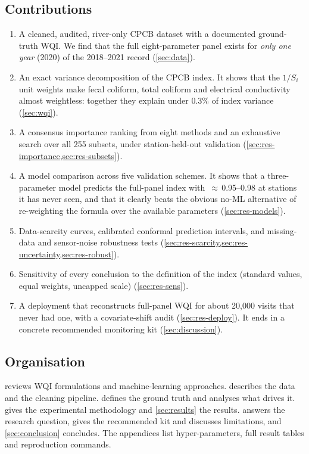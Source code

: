 \subsection{Contributions}

\begin{enumerate}
  \item A cleaned, audited, river-only CPCB dataset with a documented ground-truth WQI. We find that the full eight-parameter panel exists for \emph{only one year} (2020) of the 2018--2021 record (\cref{sec:data}).
  \item An exact variance decomposition of the CPCB index. It shows that the $1/S_i$ unit weights make fecal coliform, total coliform and electrical conductivity almost weightless: together they explain under 0.3\% of index variance (\cref{sec:wqi}).
  \item A consensus importance ranking from eight methods and an exhaustive search over all 255 subsets, under station-held-out validation (\cref{sec:res-importance,sec:res-subsets}).
  \item A model comparison across five validation schemes. It shows that a three-parameter model predicts the full-panel index with \R{}\,$\approx$\,0.95--0.98 at stations it has never seen, and that it clearly beats the obvious no-ML alternative of re-weighting the formula over the available parameters (\cref{sec:res-models}).
  \item Data-scarcity curves, calibrated conformal prediction intervals, and missing-data and sensor-noise robustness tests (\cref{sec:res-scarcity,sec:res-uncertainty,sec:res-robust}).
  \item Sensitivity of every conclusion to the definition of the index (standard values, equal weights, uncapped scale) (\cref{sec:res-sens}).
  \item A deployment that reconstructs full-panel WQI for about 20,000 visits that never had one, with a covariate-shift audit (\cref{sec:res-deploy}). It ends in a concrete recommended monitoring kit (\cref{sec:discussion}).
\end{enumerate}

\subsection{Organisation}

 reviews WQI formulations and machine-learning approaches.  describes the data and the cleaning pipeline.  defines the ground truth and analyses what drives it.  gives the experimental methodology and \cref{sec:results} the results.  answers the research question, gives the recommended kit and discusses limitations, and \cref{sec:conclusion} concludes. The appendices list hyper-parameters, full result tables and reproduction commands.
